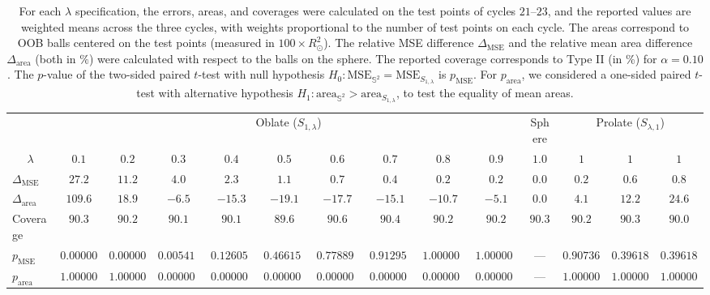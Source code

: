 \begin{table}[hpbt]
\setlength{\tabcolsep}{1.5pt}
\centering
\begin{tabular}{lccccccccc|c|ccc}
\toprule
\multicolumn{1}{c}{} & \multicolumn{9}{c}{Oblate ($S_{1, \lambda}$)} &  \multicolumn{1}{c}{Sphere} & \multicolumn{3}{c}{Prolate ($S_{\lambda, 1}$)} \\
 \cmidrule(lr){2-10} \cmidrule(lr){11-11}  \cmidrule(lr){12-14}
\multicolumn{1}{c}{$\lambda$} & $0.1$ & $0.2$ & $0.3$ & $0.4$ & $\mathbf{0.5}$ & $0.6$ & $0.7$ & $0.8$ & $0.9$ & $1.0$ & $1$ & $1$ & $1$ \\
\midrule
$\Delta_{\mathrm{MSE}}$ & $27.2$ & $11.2$ & $4.0$ & $2.3$ & $1.1$ & $0.7$ & $0.4$ & $0.2$ & $0.2$ & $0.0$ & $0.2$ & $0.6$ & $0.8$ \\
$\Delta_{\mathrm{area}}$ & $109.6$ & $18.9$ & $-6.5$ & $-15.3$ & $\mathbf{-19.1}$ & $-17.7$ & $-15.1$ & $-10.7$ & $-5.1$ & $0.0$ & $4.1$ & $12.2$ & $24.6$ \\
Coverage & $90.3$ & $90.2$ & $90.1$ & $90.1$ & $89.6$ & $90.6$ & $90.4$ & $90.2$ & $90.2$ & $90.3$ & $90.2$ & $90.3$ & $90.0$ \\
$p_{\mathrm{MSE}}$ & $0.0000000000$ & $0.0000000000$ & $0.0054149243$ & $0.1260519183$ & $0.4661524467$ & $0.7788942125$ & $0.9129513746$ & $1.0000000000$ & $1.0000000000$ & --- & $0.9073607039$ & $0.3961855621$ & $0.3961855621$ \\
$p_{\mathrm{area}}$ & $1.0000000000$ & $1.0000000000$ & $0.0000000000$ & $0.0000000000$ & $0.0000000000$ & $0.0000000000$ & $0.0000000000$ & $0.0000000000$ & $0.0000000000$ & --- & $1.0000000000$ & $1.0000000000$ & $1.0000000000$ \\
\bottomrule
\end{tabular}
\caption{For each $\lambda$ specification, the errors, areas, and coverages were calculated on the test points of cycles $21$--$23$, and the reported values are weighted means across the three cycles, with weights proportional to the number of test points on each cycle. The areas correspond to OOB balls centered on the test points (measured in $100 \times R_\odot^2$). The relative MSE difference $\Delta_{\mathrm{MSE}}$ and the relative mean area difference $\Delta_{\mathrm{area}}$ (both in $\%$) were calculated with respect to the balls on the sphere. The reported coverage corresponds to Type II (in \%) for $\alpha=0.10$. The $p$-value of the two-sided paired $t$-test with null hypothesis $H_0: \mathrm{MSE}_{\mathbb{S}^2} = \mathrm{MSE}_{S_{1, \lambda}}$ is $p_{\mathrm{MSE}}$. For $p_{\mathrm{area}}$, we considered a one-sided paired $t$-test with alternative hypothesis $H_1: \mathrm{area}_{\mathbb{S}^2} > \mathrm{area}_{S_{1, \lambda}}$, to test the equality of mean areas.}\label{tab:spheroid_metrics}
\end{table}